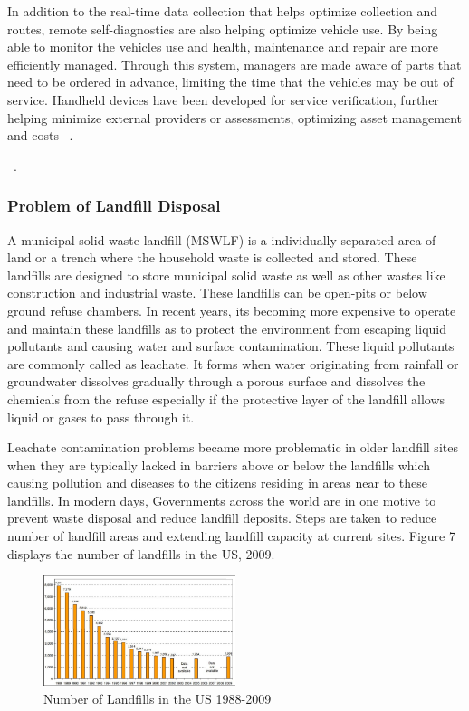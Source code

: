 \documentclass[sigconf]{acmart}
\begin{document}
In addition to the real-time data collection that helps optimize collection and routes, remote self-diagnostics are also helping optimize vehicle use.  By being able to monitor the vehicles use and health, maintenance and repair are more efficiently managed.  Through this system, managers are made aware of parts that need to be ordered in advance, limiting the time that the vehicles may be out of service.  Handheld devices have been developed for service verification, further helping minimize external providers or assessments, optimizing asset management and costs ~\cite{megan2017}.


~\cite{shahrokni2014big}.

\subsubsection{Problem of Landfill Disposal}

A municipal solid waste landfill (MSWLF) is a individually separated area of land or a trench where the household waste is collected and stored. These landfills are designed to store municipal solid waste as well as other wastes like construction and industrial waste. These landfills can be open-pits or below ground refuse chambers. In recent years, its becoming more expensive to operate and maintain these landfills as to protect the environment from escaping liquid pollutants and causing water and surface contamination. These liquid pollutants are commonly called as leachate. It forms when water originating from rainfall or groundwater dissolves gradually through a porous surface and dissolves the chemicals from the refuse especially if the protective layer of the landfill allows liquid or gases to pass through it. 

Leachate contamination problems became more problematic in older landfill sites when they are typically lacked in barriers above or below the landfills which causing pollution and diseases to the citizens residing in areas near to these landfills. In modern days, Governments across the world are in one motive to prevent waste disposal and reduce landfill deposits. Steps are taken to reduce number of landfill areas and extending landfill capacity at current sites. Figure 7 displays the number of landfills in the US, 2009.

\begin{figure}[ht!]
  \includegraphics[width=0.5\textwidth]{landfills.png}
  \caption{Number of Landfills in the US 1988-2009}
\end{figure}
\end{document}
